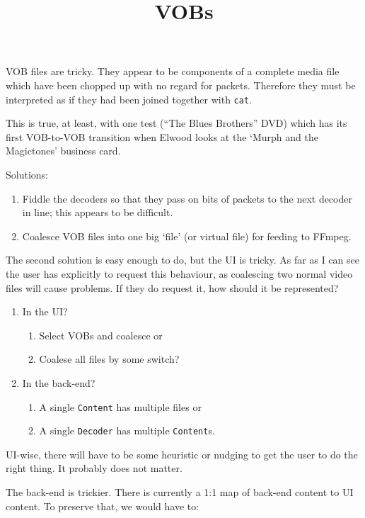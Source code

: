 \documentclass{article}
\title{VOBs}
\author{}
\date{}
\begin{document}
\maketitle

VOB files are tricky.  They appear to be components of a complete
media file which have been chopped up with no regard for packets.
Therefore they must be interpreted as if they had been joined together
with \texttt{cat}.

This is true, at least, with one test (``The Blues Brothers'' DVD)
which has its first VOB-to-VOB transition when Elwood looks at the
`Murph and the Magictones' business card.

Solutions:
\begin{enumerate}
\item Fiddle the decoders so that they pass on bits of packets
  to the next decoder in line; this appears to be difficult.
\item Coalesce VOB files into one big `file' (or virtual file)
  for feeding to FFmpeg.
\end{enumerate}

The second solution is easy enough to do, but the UI is tricky.  As
far as I can see the user has explicitly to request this behaviour, as
coalescing two normal video files will cause problems.  If they do
request it, how should it be represented?

\begin{enumerate}
\item In the UI?
\begin{enumerate}
\item Select VOBs and coalesce or
\item Coalese all files by some switch?
\end{enumerate}
\item In the back-end?
\begin{enumerate}
\item A single \texttt{Content} has multiple files or
\item A single \texttt{Decoder} has multiple \texttt{Content}s.
\end{enumerate}
\end{enumerate}

UI-wise, there will have to be some heuristic or nudging to get the
user to do the right thing.  It probably does not matter.

The back-end is trickier.  There is currently a 1:1 map of back-end
content to UI content.  To preserve that, we would have to:
\end{document}
